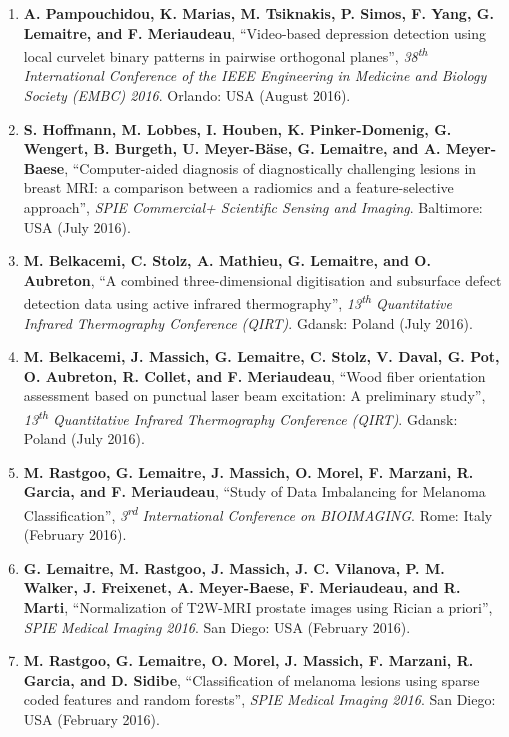 {\begin{enumerate}
\item \textbf{A. Pampouchidou, K. Marias, M. Tsiknakis, P. Simos, F. Yang, G. Lemaitre, and F. Meriaudeau}, ``Video-based depression detection using local curvelet binary patterns in pairwise orthogonal planes'', \textit{38\textsuperscript{th} International Conference of the IEEE Engineering in Medicine and Biology Society (EMBC) 2016}. Orlando: USA (August 2016).

\item \textbf{S. Hoffmann, M. Lobbes, I. Houben, K. Pinker-Domenig, G. Wengert, B. Burgeth, U. Meyer-Bäse, G. Lemaitre, and A. Meyer-Baese}, ``Computer-aided diagnosis of diagnostically challenging lesions in breast MRI: a comparison between a radiomics and a feature-selective approach'', \textit{SPIE Commercial+ Scientific Sensing and Imaging}. Baltimore: USA (July 2016).

\item \textbf{M. Belkacemi, C. Stolz, A. Mathieu, G. Lemaitre, and O. Aubreton}, ``A combined three-dimensional digitisation and subsurface defect detection data using active infrared thermography'', \textit{13\textsuperscript{th} Quantitative Infrared Thermography Conference (QIRT)}. Gdansk: Poland (July 2016).

\item \textbf{M. Belkacemi, J. Massich, G. Lemaitre, C. Stolz, V. Daval, G. Pot, O. Aubreton, R. Collet, and F. Meriaudeau}, ``Wood fiber orientation assessment based on punctual laser beam excitation: A preliminary study'', \textit{13\textsuperscript{th} Quantitative Infrared Thermography Conference (QIRT)}. Gdansk: Poland (July 2016).

\item \textbf{M. Rastgoo, G. Lemaitre, J. Massich, O. Morel, F. Marzani, R. Garcia, and F. Meriaudeau}, ``Study of Data Imbalancing for Melanoma Classification'', \textit{3\textsuperscript{rd} International Conference on BIOIMAGING}. Rome: Italy (February 2016).

\item \textbf{G. Lemaitre, M. Rastgoo, J. Massich, J. C. Vilanova, P. M. Walker, J. Freixenet, A. Meyer-Baese, F. Meriaudeau, and R. Marti}, ``Normalization of T2W-MRI prostate images using Rician a priori'', \textit{SPIE Medical Imaging 2016}. San Diego: USA (February 2016).

\item \textbf{M. Rastgoo, G. Lemaitre, O. Morel, J. Massich, F. Marzani, R. Garcia, and D. Sidibe}, ``Classification of melanoma lesions using sparse coded features and random forests'', \textit{SPIE Medical Imaging 2016}. San Diego: USA (February 2016).


\end{enumerate}}
